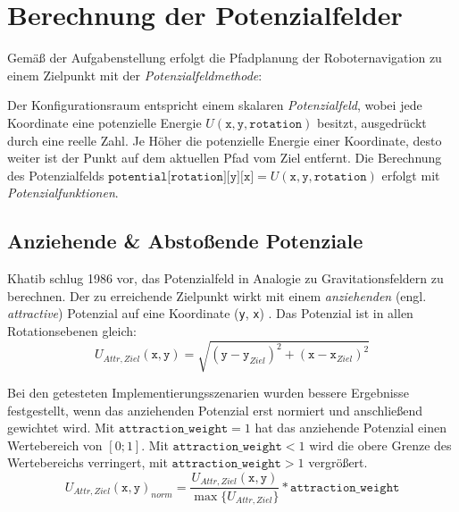 \chapter{Berechnung der Potenzialfelder}

Gemäß der Aufgabenstellung erfolgt die Pfadplanung der Roboternavigation zu einem Zielpunkt mit der \textit{Potenzialfeldmethode}:

Der Konfigurationsraum entspricht einem skalaren \textit{Potenzialfeld}, wobei jede Koordinate eine potenzielle Energie $U(\texttt{x}, \texttt{y}, \texttt{rotation})$ besitzt, ausgedrückt durch eine reelle Zahl.
Je Höher die potenzielle Energie einer Koordinate, desto weiter ist der Punkt auf dem aktuellen Pfad vom Ziel entfernt.
\cite{yujiang.2017}
Die Berechnung des Potenzialfelds $\texttt{potential[rotation][y][x]} = U(\texttt{x}, \texttt{y}, \texttt{rotation})$ erfolgt mit \textit{Potenzialfunktionen}.

\section{Anziehende \& Abstoßende Potenziale}

Khatib schlug 1986 vor, das Potenzialfeld in Analogie zu Gravitationsfeldern zu berechnen. Der zu erreichende Zielpunkt wirkt mit einem \textit{anziehenden} (engl. \textit{attractive}) Potenzial auf eine Koordinate (\texttt{y}, \texttt{x}) \cite{khatib.1985}. Das Potenzial ist in allen Rotationsebenen gleich:
\vspace*{0.2cm}
\begin{equation*}
U_{Attr, Ziel}(\texttt{x}, \texttt{y}) = \sqrt{(\texttt{y} - \texttt{y}_{Ziel})^2 + (\texttt{x} - \texttt{x}_{Ziel})^2}
\end{equation*}

\vspace*{-0.1cm}
Bei den getesteten Implementierungsszenarien wurden bessere Ergebnisse festgestellt, wenn das anziehenden Potenzial erst normiert und anschließend gewichtet wird. Mit $\texttt{attraction\_weight} = 1$ hat das anziehende Potenzial einen Wertebereich von $[0;1]$. Mit  $\texttt{attraction\_weight} < 1$ wird die obere Grenze des Wertebereichs verringert, mit $\texttt{attraction\_weight} > 1$ vergrößert.
\vspace*{0.2cm}
\begin{equation*}
U_{Attr, Ziel}(\texttt{x}, \texttt{y})_{norm} = \frac{U_{Attr, Ziel}(\texttt{x}, \texttt{y})}{\max \{ U_{Attr, Ziel}\}} * \texttt{attraction\_weight} 
\end{equation*}

